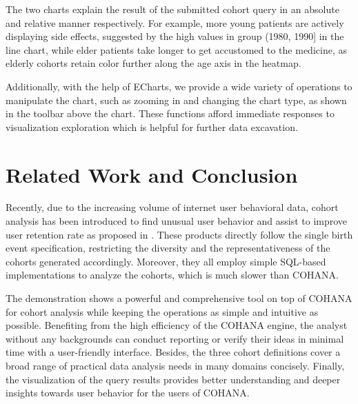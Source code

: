\documentclass[10pt,conference,letterpaper]{IEEEtran}
\begin{document}
The two charts explain the result of the submitted cohort query in an absolute and relative manner respectively. For example, more young patients are actively displaying side effects, suggested by the high values in group (1980, 1990] in the line chart, while elder patients take longer to get accustomed to the medicine, as elderly cohorts retain color further along the age axis in the heatmap.

Additionally, with the help of ECharts\cite{echarts}, we provide a wide variety of operations to manipulate the chart, such as zooming in and changing the chart type, as shown in the toolbar above the chart. These functions afford immediate responses to visualization exploration which is helpful for further data excavation.

\section{Related Work and Conclusion}

Recently, due to the increasing volume of internet user behavioral data, cohort
analysis has been introduced to find unusual user behavior and assist to
improve user retention rate as proposed in \cite{amplitude, mixpanel, rjmetrics}. These
products directly follow the single birth event specification, restricting the diversity and the representativeness of the cohorts generated accordingly.
Moreover, they all employ simple SQL-based implementations to analyze the cohorts, which is much slower than COHANA.

The demonstration shows a powerful and comprehensive tool on top of COHANA for cohort analysis while keeping the operations as simple and intuitive as possible. Benefiting from the high efficiency of the COHANA engine, the analyst without any backgrounds can conduct reporting or verify their ideas in minimal time with a user-friendly interface. Besides, the three cohort definitions cover a broad range of practical data analysis needs in many domains concisely. Finally, the visualization of the query results provides better understanding and deeper insights towards user behavior for the users of COHANA.







\end{document}

